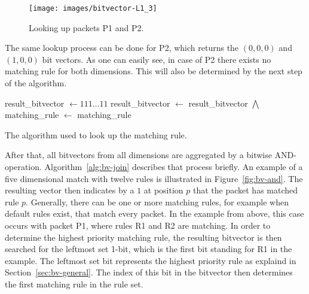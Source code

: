 \documentclass[a4paper,
		12pt,
		parskip=full,
		titlepage
		]{scrartcl}
\begin{document}
\begin{figure}
\centering
\texttt{[image: images/bitvector-L1\_3]}
\caption{Looking up packets P1 and P2.}
\label{fig:bv-lookup}
\end{figure}

The same lookup process can be done for P2, which returns the $(0, 0, 0)$ and $(1, 0, 0)$ bit vectors.
As one can easily see, in case of P2 there exists no matching rule for both dimensions.
This will also be determined by the next step of the algorithm.

\begin{algorithm}
\begin{algorithmic}
    \State result\_bitvector $\gets 111\ldots 11$
        \State result\_bitvector $\gets$ result\_bitvector $\bigwedge$ 
    \EndFor
    \State matching\_rule $\gets$ 
    \State \Return matching\_rule
\EndFunction
\end{algorithmic}
\caption{The algorithm used to look up the matching rule.}
\label{alg:bv-join}
\end{algorithm}

After that, all bitvectors from all dimensions are aggregated by a bitwise AND-operation.
Algorithm~\ref{alg:bv-join} describes that process briefly.
An example of a five dimensional match with twelve rules is illustrated in Figure~\ref{fig:bv-and}.
The resulting vector then indicates by a $1$ at position $p$ that the packet has matched rule $p$.
Generally, there can be one or more matching rules, for example when default rules exist, that match every packet.
In the example from above, this case occurs with packet P1, where rules R1 and R2 are matching.
In order to determine the highest priority matching rule, the resulting 
bitvector is then searched for the leftmost set 1-bit, which is the first bit standing for R1 in the example.
The leftmost set bit represents the highest priority rule as explaind in Section~\ref{sec:bv-general}.
The index of this bit in the bitvector then determines the first matching rule in the rule set.
\end{document}

